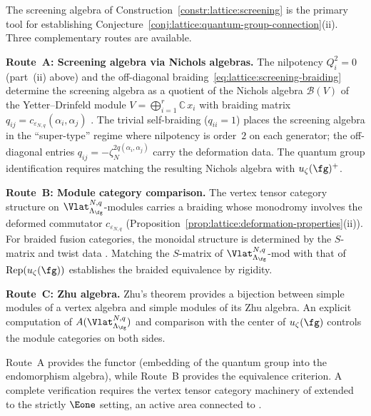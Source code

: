 \begin{remark}
\label{rem:lattice:qg-deformation}
The screening algebra of
Construction~\ref{constr:lattice:screening} is the primary
tool for establishing
Conjecture~\ref{conj:lattice:quantum-group-connection}(ii).
Three complementary routes are available.

\smallskip
\noindent\textbf{Route~A\textup{:} Screening algebra via Nichols
algebras.}
The nilpotency $Q_i^2 = 0$ (part~(ii) above) and the
off-diagonal braiding~\eqref{eq:lattice:screening-braiding}
determine the screening algebra as a quotient of the Nichols
algebra $\mathcal{B}(V)$ of the Yetter--Drinfeld module
$V = \bigoplus_{i=1}^r \mathbb{C}\, x_i$ with braiding matrix
$q_{ij} = c_{\varepsilon_{N,q}}(\alpha_i,\alpha_j)$
\cite{Lentner17}.
The trivial self-braiding ($q_{ii} = 1$) places the screening
algebra in the ``super-type'' regime where nilpotency is
order~$2$ on each generator; the off-diagonal entries
$q_{ij} = -\zeta_N^{2q(\alpha_i,\alpha_j)}$ carry the
deformation data. The quantum group identification requires
matching the resulting Nichols algebra with $u_\zeta(\fg)^+$.

\smallskip
\noindent\textbf{Route~B\textup{:} Module category comparison.}
The vertex tensor category structure on
$\Vlat_{\Lambda_\fg}^{N,q}$-modules \cite{HLZ} carries a
braiding whose monodromy involves the deformed commutator
$c_{\varepsilon_{N,q}}$
(Proposition~\ref{prop:lattice:deformation-properties}(ii)).
For braided fusion categories, the monoidal structure is
determined by the $S$-matrix and twist data \cite{EGNO}.
Matching the $S$-matrix of
$\Vlat_{\Lambda_\fg}^{N,q}$-$\mathrm{mod}$ with that of
$\operatorname{Rep}(u_\zeta(\fg))$ establishes the braided
equivalence by rigidity.

\smallskip
\noindent\textbf{Route~C\textup{:} Zhu algebra.}
Zhu's theorem provides a bijection between simple modules of a
vertex algebra and simple modules of its Zhu algebra.
An explicit computation of
$A(\Vlat_{\Lambda_\fg}^{N,q})$ and comparison with the center
of $u_\zeta(\fg)$ controls the module categories on both sides.

\smallskip
Route~A provides the functor (embedding of the quantum group
into the endomorphism algebra), while Route~B provides the
equivalence criterion. A complete verification requires the
vertex tensor category machinery of \cite{HLZ} extended to the
strictly $\Eone$ setting, an active area connected to
\cite{CreutzigGainutdinovRunkel20,Lentner17}.
\end{remark}

